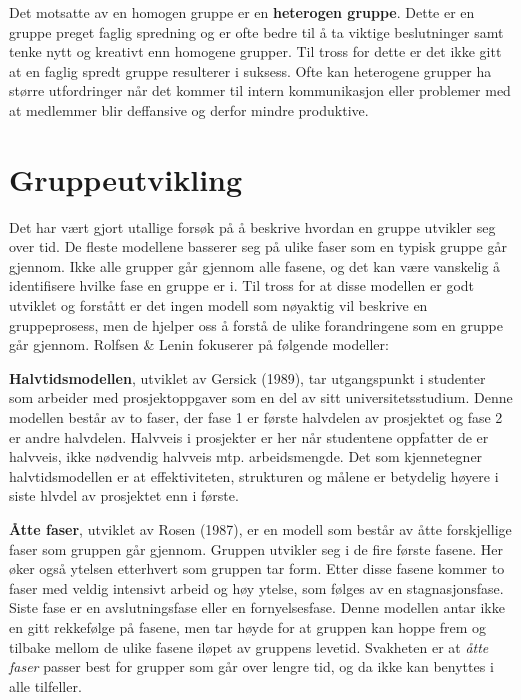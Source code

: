 Det motsatte av en homogen gruppe er en \textbf{heterogen gruppe}. 
Dette er en gruppe preget faglig spredning og er ofte bedre til å ta viktige beslutninger samt tenke nytt og kreativt enn homogene grupper. 
Til tross for dette er det ikke gitt at en faglig spredt gruppe resulterer i suksess. 
Ofte kan heterogene grupper ha større utfordringer når det kommer til intern kommunikasjon eller problemer med at medlemmer blir deffansive og derfor mindre produktive. 

\section{Gruppeutvikling}
Det har vært gjort utallige forsøk på å beskrive hvordan en gruppe utvikler seg over tid. 
De fleste modellene basserer seg på ulike faser som en typisk gruppe går gjennom. 
Ikke alle grupper går gjennom alle fasene, og det kan være vanskelig å identifisere hvilke fase en gruppe er i.
Til tross for at disse modellen er godt utviklet og forstått er det ingen modell som nøyaktig vil beskrive en gruppeprosess, men de hjelper oss å forstå de ulike forandringene som en gruppe går gjennom. 
Rolfsen \& Lenin fokuserer på følgende modeller:
\vspace{\secspace}

\textbf{Halvtidsmodellen}, utviklet av Gersick (1989), tar utgangspunkt i studenter som arbeider med prosjektoppgaver som en del av sitt universitetsstudium.
Denne modellen består av to faser, der fase 1 er første halvdelen av prosjektet og fase 2 er andre halvdelen. 
Halvveis i prosjekter er her når studentene oppfatter de er halvveis, ikke nødvendig halvveis mtp. arbeidsmengde. 
Det som kjennetegner halvtidsmodellen er at effektiviteten, strukturen og målene er betydelig høyere i siste hlvdel av prosjektet enn i første. 
\vspace{\secspace}

\textbf{Åtte faser}, utviklet av Rosen (1987), er en modell som består av åtte forskjellige faser som gruppen går gjennom.
Gruppen utvikler seg i de fire første fasene. Her øker også ytelsen etterhvert som gruppen tar form.
Etter disse fasene kommer to faser med veldig intensivt arbeid og høy ytelse, som følges av en stagnasjonsfase. 
Siste fase er en avslutningsfase eller en fornyelsesfase.
Denne modellen antar ikke en gitt rekkefølge på fasene, men tar høyde for at gruppen kan hoppe frem og tilbake mellom de ulike fasene iløpet av gruppens levetid. 
Svakheten er at \textit{åtte faser} passer best for grupper som går over lengre tid, og da ikke kan benyttes i alle tilfeller. 
\vspace{\secspace}

